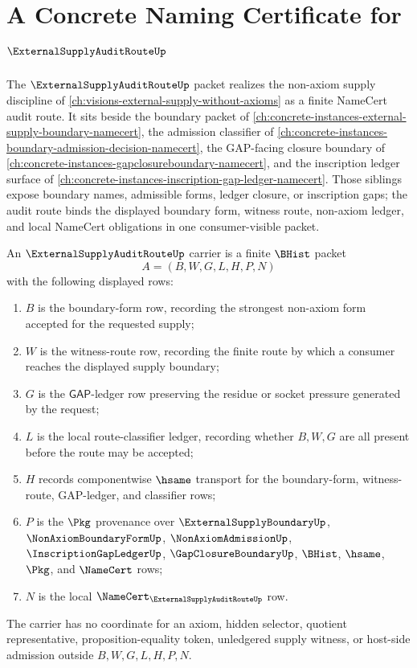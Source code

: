 \chapter{A Concrete Naming Certificate for $\ExternalSupplyAuditRouteUp$}
\label{ch:concrete-instances-externalsupplyauditroute-namecert}

The $\ExternalSupplyAuditRouteUp$ packet realizes the non-axiom supply discipline of \autoref{ch:visions-external-supply-without-axioms} as a finite NameCert audit route. It sits beside the boundary packet of \autoref{ch:concrete-instances-external-supply-boundary-namecert}, the admission classifier of \autoref{ch:concrete-instances-boundary-admission-decision-namecert}, the GAP-facing closure boundary of \autoref{ch:concrete-instances-gapclosureboundary-namecert}, and the inscription ledger surface of \autoref{ch:concrete-instances-inscription-gap-ledger-namecert}. Those siblings expose boundary names, admissible forms, ledger closure, or inscription gaps; the audit route binds the displayed boundary form, witness route, non-axiom ledger, and local NameCert obligations in one consumer-visible packet.

\begin{definition}
\label{def:external-supply-audit-route-carrier}
An $\ExternalSupplyAuditRouteUp$ carrier is a finite $\BHist$ packet
$$
A=(B,W,G,L,H,P,N)
$$
with the following displayed rows:
\begin{enumerate}
\item $B$ is the boundary-form row, recording the strongest non-axiom form accepted for the requested supply;
\item $W$ is the witness-route row, recording the finite route by which a consumer reaches the displayed supply boundary;
\item $G$ is the $\mathsf{GAP}$-ledger row preserving the residue or socket pressure generated by the request;
\item $L$ is the local route-classifier ledger, recording whether $B,W,G$ are all present before the route may be accepted;
\item $H$ records componentwise $\hsame$ transport for the boundary-form, witness-route, GAP-ledger, and classifier rows;
\item $P$ is the $\Pkg$ provenance over $\ExternalSupplyBoundaryUp$, $\NonAxiomBoundaryFormUp$, $\NonAxiomAdmissionUp$, $\InscriptionGapLedgerUp$, $\GapClosureBoundaryUp$, $\BHist$, $\hsame$, $\Pkg$, and $\NameCert$ rows;
\item $N$ is the local $\NameCert_{\ExternalSupplyAuditRouteUp}$ row.
\end{enumerate}
The carrier has no coordinate for an axiom, hidden selector, quotient representative, proposition-equality token, unledgered supply witness, or host-side admission outside $B,W,G,L,H,P,N$.
\end{definition}

